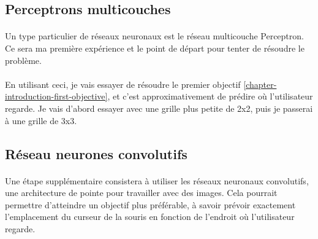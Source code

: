\subsection{Perceptrons multicouches}
\paragraph{}
Un type particulier de réseaux neuronaux est le réseau multicouche Perceptron.
Ce sera ma première expérience et le point de départ pour tenter de résoudre le problème.

\paragraph{}
En utilisant ceci, je vais essayer de résoudre le premier objectif \ref{chapter-introduction-first-objective}, et c'est approximativement de prédire où l'utilisateur regarde.
Je vais d'abord essayer avec une grille plus petite de 2x2, puis je passerai à une grille de 3x3.

\subsection{Réseau neurones convolutifs}
\paragraph{}
Une étape supplémentaire consistera à utiliser les réseaux neuronaux convolutifs, une architecture de pointe pour travailler avec des images.
Cela pourrait permettre d'atteindre un objectif plus préférable, à savoir prévoir exactement l'emplacement du curseur de la souris en fonction de l'endroit où l'utilisateur regarde.

